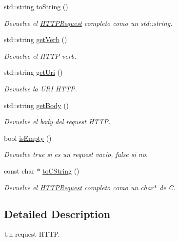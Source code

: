 \begin{DoxyCompactItemize}
std\+::string \hyperlink{class_h_t_t_p_request_a0905012de141cce7785b33c8d10623c8}{to\+String} ()
\begin{DoxyCompactList}\small\item\em Devuelve el \hyperlink{class_h_t_t_p_request}{H\+T\+T\+P\+Request} completo como un std\+::string. \end{DoxyCompactList}\item 
std\+::string \hyperlink{class_h_t_t_p_request_a61c8ac8a58c99264eba833d60c2f6bed}{get\+Verb} ()
\begin{DoxyCompactList}\small\item\em Devuelve el H\+T\+T\+P verb. \end{DoxyCompactList}\item 
std\+::string \hyperlink{class_h_t_t_p_request_a8c16faf7c470e4b000782391b4978079}{get\+Uri} ()
\begin{DoxyCompactList}\small\item\em Devuelve la U\+R\+I H\+T\+T\+P. \end{DoxyCompactList}\item 
std\+::string \hyperlink{class_h_t_t_p_request_a205e7dbafc6888087b742f7de91d421d}{get\+Body} ()
\begin{DoxyCompactList}\small\item\em Devuelve el body del request H\+T\+T\+P. \end{DoxyCompactList}\item 
bool \hyperlink{class_h_t_t_p_request_ab9cbbd29971d2773d8d5dbeff9eb27d8}{is\+Empty} ()
\begin{DoxyCompactList}\small\item\em Devuelve true si es un request vacío, false si no. \end{DoxyCompactList}\item 
const char $\ast$ \hyperlink{class_h_t_t_p_request_acaf1b7dfb647339812e92d14d8921cfd}{to\+C\+String} ()
\begin{DoxyCompactList}\small\item\em Devuelve el \hyperlink{class_h_t_t_p_request}{H\+T\+T\+P\+Request} completo como un char$\ast$ de C. \end{DoxyCompactList}\end{DoxyCompactItemize}


\subsection{Detailed Description}
Un request H\+T\+T\+P. 

